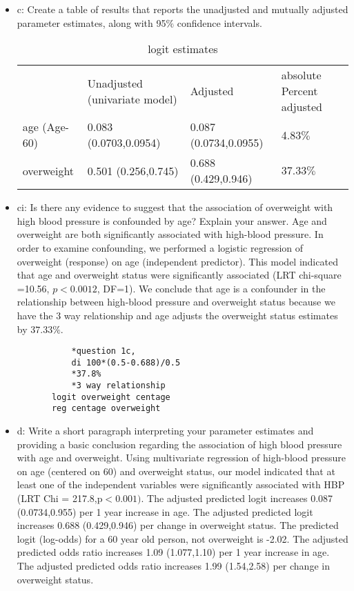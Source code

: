 \documentclass{article}
\begin{document}
\begin{itemize}
     \item c:  Create a table of results that reports the unadjusted and mutually adjusted parameter estimates, along with 95$\%$ confidence intervals. 
     
       \begin{table}
          \caption{\label{tab:table-name} logit estimates}
\begin{tabular}{llll}
 & Unadjusted (univariate model)  & Adjusted  & absolute Percent adjusted  \\
age (Age-60) & 0.083 (0.0703,0.0954)  & 0.087 (0.0734,0.0955) & 4.83$\%$   \\
 overweight &  0.501 (0.256,0.745) & 0.688 (0.429,0.946)  & $37.33\%$  \\
\end{tabular}
\end{table}
     
     
     \item ci:  Is there any evidence to suggest that the association of overweight with high blood pressure is confounded by age?  Explain your answer.
      Age and overweight are both significantly associated with high-blood pressure.  In order to examine confounding, we performed a logistic regression of overweight (response) on age (independent predictor).  This model indicated that age and overweight status were significantly associated (LRT chi-square =10.56, $p<0.0012$, DF=1).  We conclude that age is a confounder in the relationship between high-blood pressure and overweight status because we have the 3 way relationship and age adjusts the overweight status estimates by $37.33\%$.
      \begin{verbatim}
           *question 1c, 
           di 100*(0.5-0.688)/0.5
           *37.8%
           *3 way relationship
       logit overweight centage 
	   reg centage overweight
      \end{verbatim}
     
     \item d: Write a short paragraph interpreting your parameter estimates and providing a basic conclusion regarding the association of high blood pressure with age and overweight.
      Using multivariate regression of high-blood pressure on age (centered on 60) and overweight status, our model indicated that at least one of the independent variables were significantly associated with HBP (LRT Chi = 217.8,p$<0.001)$.  The adjusted predicted logit increases 0.087 (0.0734,0.955) per 1 year increase in age.  The adjusted predicted logit increases 0.688 (0.429,0.946) per change in overweight status. The predicted logit (log-odds) for a 60 year old person, not overweight is -2.02.
      The adjusted predicted odds ratio increases 1.09 (1.077,1.10) per 1 year increase in age.  The adjusted predicted odds ratio increases 1.99 (1.54,2.58) per change in overweight status. 
      

\end{itemize}
\end{document}
